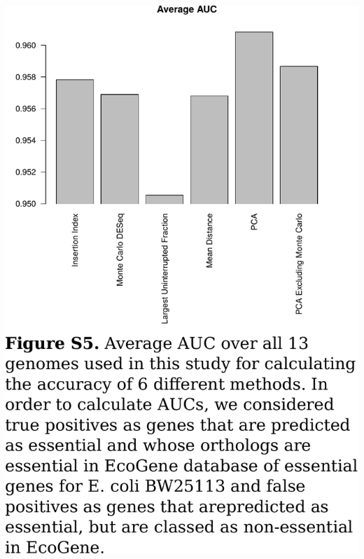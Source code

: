 \documentclass{article}
\newcommand{\Newpage}{\end{preview}\begin{preview}}
\begin{document}
\begin{preview}
\includegraphics{suppl5.pdf}
\Newpage

\end{preview}
\end{document}

